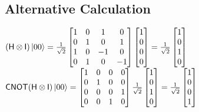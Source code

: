 \documentclass{iansnotes}
\begin{document}
\subsection{Alternative Calculation}
$(\mathsf{H} \otimes \mathsf{I})\ket{00} = 
\frac{1}{\sqrt{2}}\begin{bmatrix}
  1 & 0 &  1 &  0 \\
  0 & 1 &  0 &  1 \\
  1 & 0 & -1 &  0 \\
  0 & 1 &  0 & -1 \\
\end{bmatrix}
\begin{bmatrix} 1 \\ 0 \\ 0 \\ 0 \end{bmatrix} = 
\frac{1}{\sqrt{2}}\begin{bmatrix} 1 \\ 0 \\ 1 \\ 0 \end{bmatrix}$\\[4mm]
$\mathsf{CNOT}(\mathsf{H} \otimes \mathsf{I})\ket{00} = 
\begin{bmatrix}
  1 & 0 & 0 & 0 \\
  0 & 1 & 0 & 0 \\
  0 & 0 & 0 & 1 \\
  0 & 0 & 1 & 0 \\
\end{bmatrix}
\frac{1}{\sqrt{2}}\begin{bmatrix} 1 \\ 0 \\ 1 \\ 0 \end{bmatrix}
= \frac{1}{\sqrt{2}}\begin{bmatrix} 1 \\ 0 \\ 0 \\ 1 \end{bmatrix}
$
\end{document}
